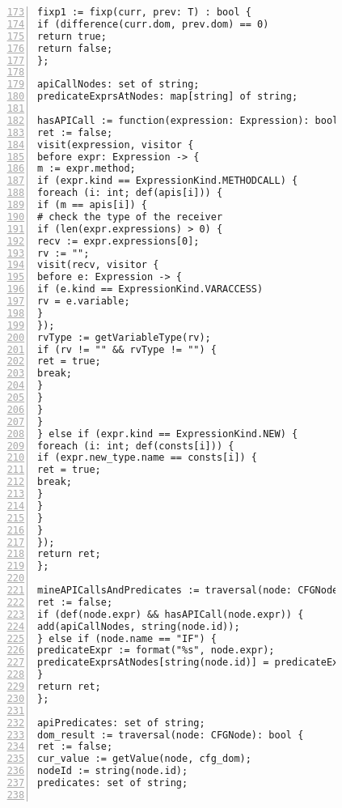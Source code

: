 \begin{figure}[ht!]
\begin{lstlisting}[numbers=left, tabsize=4, escapechar=@, caption={API Precondition Mining Analysis},label={lst:apm-code}, firstline = 173, firstnumber = 173, lastline = 234]
fixp1 := fixp(curr, prev: T) : bool {
if (difference(curr.dom, prev.dom) == 0)
return true;	
return false;
};

apiCallNodes: set of string;
predicateExprsAtNodes: map[string] of string;

hasAPICall := function(expression: Expression): bool {
ret := false;
visit(expression, visitor {
before expr: Expression -> {
m := expr.method;
if (expr.kind == ExpressionKind.METHODCALL) {
foreach (i: int; def(apis[i])) {
if (m == apis[i]) {
# check the type of the receiver
if (len(expr.expressions) > 0) {
recv := expr.expressions[0];
rv := "";
visit(recv, visitor {
before e: Expression -> {
if (e.kind == ExpressionKind.VARACCESS) 
rv = e.variable;
}
});
rvType := getVariableType(rv);
if (rv != "" && rvType != "") {
ret = true;
break;
}
}
}
} 
} else if (expr.kind == ExpressionKind.NEW) {
foreach (i: int; def(consts[i])) {
if (expr.new_type.name == consts[i]) {
ret = true;
break;
}
}
}
}
});
return ret;
};

mineAPICallsAndPredicates := traversal(node: CFGNode): bool { 
ret := false;
if (def(node.expr) && hasAPICall(node.expr)) {
add(apiCallNodes, string(node.id));
} else if (node.name == "IF") {
predicateExpr := format("%s", node.expr);
predicateExprsAtNodes[string(node.id)] = predicateExpr;
}
return ret;
};

apiPredicates: set of string;
dom_result := traversal(node: CFGNode): bool {
ret := false;
cur_value := getValue(node, cfg_dom);
nodeId := string(node.id);
predicates: set of string;


\end{lstlisting}
\end{figure}
